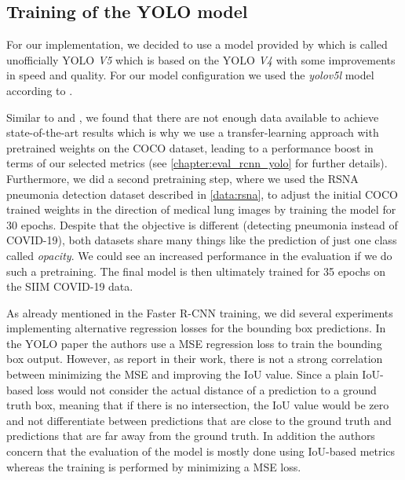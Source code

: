 \subsection*{Training of the \ac{YOLO} model}
For our implementation, we decided to use a model provided by \autocite{yolov5} which is called unofficially YOLO \textit{V5} which is based on the YOLO \textit{V4} with some improvements in speed and quality. For our model configuration we used the \textit{yolov5l} model according to \autocite{yolov5}.

Similar to \autocite{CoronaDLTransfer} and  \autocite{mangal2020covidaid}, we found that there are not enough data available to achieve state-of-the-art results which is why we use a transfer-learning approach with pretrained weights on the COCO \autocite{coco} dataset, leading to a performance boost in terms of our selected metrics (see \vref{chapter:eval_rcnn_yolo} for further details). Furthermore, we did a second pretraining step, where we used the RSNA pneumonia detection dataset described in \vref{data:rsna}, to adjust the initial COCO trained weights in the direction of medical lung images by training the model for 30 epochs. Despite that the objective is different (detecting pneumonia instead of COVID-19), both datasets share many things like the prediction of just one class called \textit{opacity}. We could see an increased performance in the evaluation if we do such a pretraining. The final model is then ultimately trained for 35 epochs on the SIIM COVID-19 data.

As already mentioned in the Faster \ac{R-CNN} training, we did several experiments implementing alternative regression losses for the bounding box predictions. In the \ac{YOLO} paper the authors use a \ac{MSE} regression loss to train the bounding box output. However, as \citeauthor{giou} \autocite{giou} report in their work, there is not a strong correlation between minimizing the \ac{MSE} and improving the \ac{IoU} value. Since a plain \ac{IoU}-based loss would not consider the actual distance of a prediction to a ground truth box, meaning that if there is no intersection, the \ac{IoU} value would be zero and not differentiate between predictions that are close to the ground truth and predictions that are far away from the ground truth.
In addition the authors concern that the evaluation of the model is mostly done using \ac{IoU}-based metrics whereas the training is performed by minimizing a \ac{MSE} loss.

